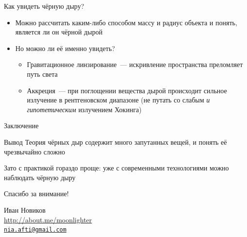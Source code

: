 \documentclass[usenames,dvipsnames,pdftex,unicode,hidelinks]{beamer}
\begin{document}
  \begin{frame}{Как увидеть чёрную дыру?}
    \begin{itemize}
      \item<1-> Можно рассчитать каким-либо способом массу и радиус объекта и понять, является ли он
        чёрной дырой
      \item<2-> Но можно ли её именно \alert{увидеть}?
        \begin{itemize}
          \item<3-> Гравитационное линзирование~--- искривление пространства преломляет путь света
          \item<4-> Аккреция~--- при поглощении вещества дырой происходит сильное излучение в
            рентгеновском диапазоне (не путать со слабым \emph{и гипотетическим} излучением Хокинга)
        \end{itemize}
    \end{itemize}
  \end{frame}



  \begin{frame}{Заключение}
    \begin{block}{Вывод}
      Теория чёрных дыр содержит много запутанных вещей, и понять её чрезвычайно сложно
      
      \vspace{1cm}

      Зато с практикой гораздо проще: уже с современными технологиями можно наблюдать чёрную дыру
    \end{block}
  \end{frame}

  \begin{frame}[plain]
    \begin{center}
      { \Huge Спасибо за внимание! }

      \vspace{1cm}

      Иван Новиков\\
      \url{http://about.me/moonlighter}\\
      \href{mailto:nia.afti@gmail.com}{\nolinkurl{nia.afti@gmail.com} }
      
    \end{center}
  \end{frame}
\end{document}
